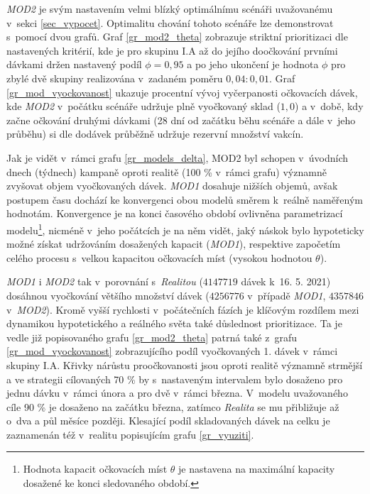 \emph{MOD2} je svým nastavením velmi blízký optimálnímu scénáři uvažovanému v~sekci \ref{sec_vypocet}. Optimalitu chování tohoto scénáře lze demonstrovat s~pomocí dvou grafů. Graf \ref{gr_mod2_theta} zobrazuje striktní prioritizaci dle nastavených kritérií, kde je pro skupinu I.A až do jejího doočkování prvními dávkami držen nastavený podíl $\phi=0,95$ a po jeho ukončení je hodnota $\phi$ pro zbylé dvě skupiny realizována v~zadaném poměru $0,04:0,01$. Graf \ref{gr_mod_vyockovanost} ukazuje procentní vývoj vyčerpanosti očkovacích dávek, kde \emph{MOD2} v~počátku scénáře udržuje plně vyočkovaný sklad ($1,0$) a v~době, kdy začne očkování druhými dávkami (28 dní od začátku běhu scénáře a dále v~jeho průběhu) si dle dodávek průběžně udržuje rezervní množství vakcín.

Jak je vidět v~rámci grafu \ref{gr_models_delta}, MOD2 byl schopen v~úvodních dnech (týdnech) kampaně oproti realitě (100 \% v~rámci grafu) významně zvyšovat objem vyočkovaných dávek. \emph{MOD1} dosahuje nižších objemů, avšak postupem času dochází ke konvergenci obou modelů směrem k~reálně naměřeným hodnotám. Konvergence je na konci časového období ovlivněna parametrizací modelu\footnote{Hodnota kapacit očkovacích míst $\theta$ je nastavena na maximální kapacity dosažené ke konci sledovaného období.}, nicméně v~jeho počátcích je na něm vidět, jaký náskok bylo hypoteticky možné získat udržováním dosažených kapacit (\emph{MOD1}), respektive započetím celého procesu s~velkou kapacitou očkovacích míst (vysokou hodnotou $\theta$).

\emph{MOD1} i \emph{MOD2} tak v~porovnání s~\emph{Realitou} ($4 147 719$ dávek k~16. 5. 2021) dosáhnou vyočkování většího množství dávek ($4 256 776$ v~případě \emph{MOD1}, $4 357 846$ v~\emph{MOD2}). Kromě vyšší rychlosti v~počátečních fázích je klíčovým rozdílem mezi dynamikou hypotetického a reálného světa také důslednost prioritizace. Ta je vedle již popisovaného grafu \ref{gr_mod2_theta} patrná také z~grafu \ref{gr_mod_vyockovanost} zobrazujícího podíl vyočkovaných 1. dávek v~rámci skupiny I.A. Křivky nárůstu proočkovanosti jsou oproti realitě významně strmější a ve strategii cílovaných 70 \% by s~nastaveným intervalem bylo dosaženo pro jednu dávku v~rámci února a pro dvě v~rámci března. V~modelu uvažovaného cíle 90 \% je dosaženo na začátku března, zatímco \emph{Realita} se mu přibližuje až o~dva a půl měsíce později. Klesající podíl skladovaných dávek na celku je zaznamenán též v~realitu popisujícím grafu \ref{gr_vyuziti}.


